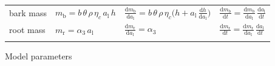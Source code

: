 \documentclass[10pt,twoside]{article}
\begin{document}
\begin{table}[h!]
\begin{tabular}{p{2.5cm}p{3.5cm}p{5cm}p{4cm} }
  bark mass &
    $m_\textrm{b} = b\, \theta \, \rho \, \eta_c \, a_\textrm{l} \, h $ &
    $\frac{\textrm{d}m_\textrm{b}}{\textrm{d}a_\textrm{l}} = b \, \theta \, \rho \, \eta_c\big( h + a_\textrm{l} \, \frac{\textrm{d}h}{\textrm{d}a_\textrm{l}} \big)$ &
    $\frac{\textrm{d}m_\textrm{b}}{\textrm{d}t}  = \frac{\textrm{d}m_\textrm{b}}{\textrm{d}a_\textrm{l}} \, \frac{\textrm{d}a_\textrm{l}}{\textrm{d}t}$ \\
  root mass &
    $m_\textrm{r} = \alpha_3 \, a_\textrm{l}$ &
    $\frac{\textrm{d}m_\textrm{r}}{\textrm{d}a_\textrm{l}} = \alpha_3$  &
    $\frac{\textrm{d}m_\textrm{r}}{\textrm{d}t}  = \frac{\textrm{d}m_\textrm{r}}{\textrm{d}a_\textrm{l}}  \, \frac{\textrm{d}a_\textrm{l}}{\textrm{d}t}$ \\ 
  \hline \\
\end{tabular}
\label{tab:allometry}
\end{table}

\newpage

\begin{table}[h!]
\caption{Model parameters}

\label{tab:params}
\end{table}

\clearpage


\end{document}
